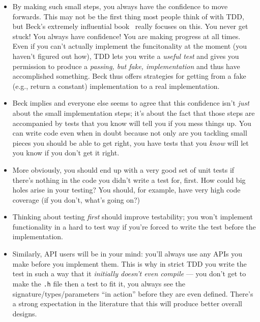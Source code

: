\documentclass[sigplan,screen]{acmart}
\begin{document}
\begin{itemize}
  \item By making such small steps, you always have the confidence to
    move forwards.  This may not be the first thing most people think
    of with TDD, but Beck's extremely influential book~\cite{beck2002test} really focuses
    on this.  You never get stuck!  You always have confidence!  You
    are making progress at all times.  Even if you can't actually
    implement the funcitonality at the moment (you haven't figured out
    how), TDD lets you write a \emph{useful test} and gives you
    permission to produce a \emph{passing,
      but fake, implementation} and thus have accomplished something.
    Beck thus offers strategies for getting from a fake (e.g., return a
    constant) implementation to a real implementation.
    \item Beck implies and everyone else seems to agree that this
      confidence isn't \emph{just} about the small implementation steps; it's about
      the fact that those steps are accompanied by tests that you know
      will tell you if you mess things up.  You can write code even
      when in doubt because not only are you tackling small pieces you
      should be able to get right, you have tests that you \emph{know}
      will let you know if you don't get it right.
      \item More obviously, you should end up with a very good set of unit
        tests if there's nothing in the code you didn't write a test
        for, first.  How could big holes arise in your testing?  You
        should, for example, have very high code coverage (if you
        don't, what's going on?)
        \item Thinking about testing \emph{first} should improve
          testability; you won't implement functionality in a hard to
          test way if you're forced to write the test before the
          implementation.
          \item Similarly, API users will be in your mind: you'll
            always use any APIs you make before you implement them.
            This is why in strict TDD you write the test in such a way
            that it \emph{initially doesn't even compile} --- you
            don't get to make the {\tt .h} file then a test to fit it,
            you always see the signature/types/parameters ``in action''
            before they are even defined.
            There's a strong expectation in the literature that this
            will produce better overall designs.
            \end{itemize}
\end{document}
